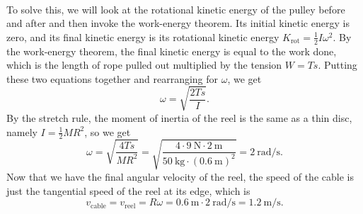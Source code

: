 \documentclass[../classical_mechanics.tex]{subfiles}
\begin{document}
\begin{example}
            \paragraph{}
            To solve this, we will look at the rotational kinetic energy of the pulley before and after and then invoke the work-energy theorem.
            Its initial kinetic energy is zero, and its final kinetic energy is its rotational kinetic energy $K_\text{rot}=\frac{1}{2}I\omega^2$.
            By the work-energy theorem, the final kinetic energy is equal to the work done, which is the length of rope pulled out multiplied by the tension $W=Ts$.
            Putting these two equations together and rearranging for $\omega$, we get
            \begin{equation}
                \omega=\sqrt{\frac{2Ts}{I}}.
            \end{equation}
            By the stretch rule, the moment of inertia of the reel is the same as a thin disc, namely $I=\frac{1}{2}MR^2$, so we get
            \begin{equation}
                \omega=\sqrt{\frac{4Ts}{MR^2}}=\sqrt{\frac{4\cdot\qty{9}{\newton}\cdot\qty{2}{\meter}}{\qty{50}{\kilogram}\cdot(\qty{0.6}{\meter})^2}}=\qty{2}{\radian\per\second}.
            \end{equation}
            Now that we have the final angular velocity of the reel, the speed of the cable is just the tangential speed of the reel at its edge, which is
            \begin{equation}
                v_\text{cable}=v_\text{reel}=R\omega=\qty{0.6}{\meter}\cdot\qty{2}{\radian\per\second}=\qty{1.2}{\meter\per\second}.
            \end{equation}
        \end{example}
\end{document}
